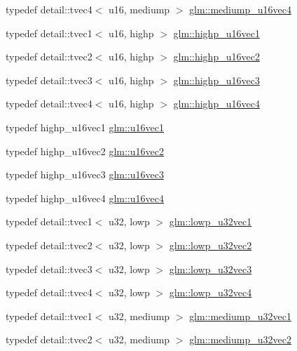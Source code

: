 \begin{CompactItemize}
\item 
typedef detail::tvec4$<$ u16, mediump $>$ \hyperlink{group__gtc__type__precision_gad8b540f4231f69823c39fe9dfcb945a}{glm::mediump\_\-u16vec4}
\item 
typedef detail::tvec1$<$ u16, highp $>$ \hyperlink{group__gtc__type__precision_gc4a83dec879b77ab0055c8da232da066}{glm::highp\_\-u16vec1}
\item 
typedef detail::tvec2$<$ u16, highp $>$ \hyperlink{group__gtc__type__precision_gfad4245d389a4990eb505cd74a2d0a6f}{glm::highp\_\-u16vec2}
\item 
typedef detail::tvec3$<$ u16, highp $>$ \hyperlink{group__gtc__type__precision_gd98b30ad9bbfb79233340be3ba53ceb6}{glm::highp\_\-u16vec3}
\item 
typedef detail::tvec4$<$ u16, highp $>$ \hyperlink{group__gtc__type__precision_g89074b108ec0643cffdfd008bedd3ffb}{glm::highp\_\-u16vec4}
\item 
typedef highp\_\-u16vec1 \hyperlink{group__gtc__type__precision_g95324b9d781c51a6d31b05fcc63c5cbe}{glm::u16vec1}
\item 
typedef highp\_\-u16vec2 \hyperlink{group__gtc__type__precision_g4beac509930099bb494b4bd0a44c49f2}{glm::u16vec2}
\item 
typedef highp\_\-u16vec3 \hyperlink{group__gtc__type__precision_g372e1184da616b77fcbd48b8c166c24a}{glm::u16vec3}
\item 
typedef highp\_\-u16vec4 \hyperlink{group__gtc__type__precision_gac02cce8820bcdbbeea9659aeaa718fb}{glm::u16vec4}
\item 
typedef detail::tvec1$<$ u32, lowp $>$ \hyperlink{group__gtc__type__precision_g579d71c2ae1225b689aaab0bc7d33146}{glm::lowp\_\-u32vec1}
\item 
typedef detail::tvec2$<$ u32, lowp $>$ \hyperlink{group__gtc__type__precision_g2f588e15c609987b89bd03f50b2a492d}{glm::lowp\_\-u32vec2}
\item 
typedef detail::tvec3$<$ u32, lowp $>$ \hyperlink{group__gtc__type__precision_g53b6133cd2491fce1445c1744556b1bb}{glm::lowp\_\-u32vec3}
\item 
typedef detail::tvec4$<$ u32, lowp $>$ \hyperlink{group__gtc__type__precision_gad6408408c9c5321cb6ee54f201de578}{glm::lowp\_\-u32vec4}
\item 
typedef detail::tvec1$<$ u32, mediump $>$ \hyperlink{group__gtc__type__precision_g323fb0ed8f492d918b087226db2994f3}{glm::mediump\_\-u32vec1}
\item 
typedef detail::tvec2$<$ u32, mediump $>$ \hyperlink{group__gtc__type__precision_g5d16ea7e110d8ba923ca347c16704f88}{glm::mediump\_\-u32vec2}

\end{CompactItemize}
